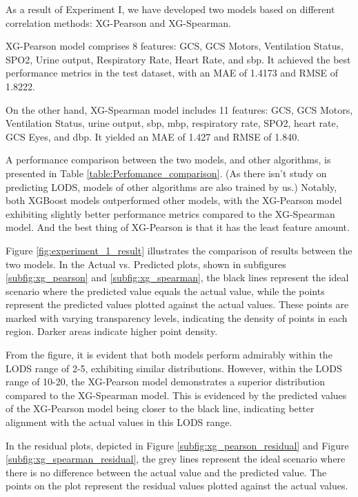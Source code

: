 \documentclass[12pt,a4paper,english
]{tunithesis}
\begin{document}
As a result of Experiment I, we have developed two models based on different correlation methods: XG-Pearson and XG-Spearman.

XG-Pearson model comprises 8 features: GCS, GCS Motors, Ventilation Status, SPO2, Urine output, Respiratory Rate, Heart Rate, and sbp. It achieved the best performance metrics in the test dataset, with an MAE of 1.4173 and RMSE of 1.8222.

On the other hand, XG-Spearman model includes 11 features: GCS, GCS Motors, Ventilation Status, urine output, sbp, mbp, respiratory rate, SPO2, heart rate, GCS Eyes, and dbp. It yielded an MAE of 1.427 and RMSE of 1.840.

A performance comparison between the two models, and other algorithms, is presented in Table \ref{table:Perfomance_comparison}. (As there isn't study on predicting LODS, models of other algorithms are also trained by us.) Notably, both XGBoost models outperformed other models, with the XG-Pearson model exhibiting slightly better performance metrics compared to the XG-Spearman model. And the best thing of XG-Pearson is that it has the least feature amount.

Figure \ref{fig:experiment_1_result} illustrates the comparison of results between the two models. In the Actual vs. Predicted plots, shown in subfigures \ref{subfig:xg_pearson} and \ref{subfig:xg_spearman}, the black lines represent the ideal scenario where the predicted value equals the actual value, while the points represent the predicted values plotted against the actual values. These points are marked with varying transparency levels, indicating the density of points in each region. Darker areas indicate higher point density.

From the figure, it is evident that both models perform admirably within the LODS range of 2-5, exhibiting similar distributions. However, within the LODS range of 10-20, the XG-Pearson model demonstrates a superior distribution compared to the XG-Spearman model. This is evidenced by the predicted values of the XG-Pearson model being closer to the black line, indicating better alignment with the actual values in this LODS range.

In the residual plots, depicted in Figure \ref{subfig:xg_pearson_residual} and Figure \ref{subfig:xg_spearman_residual}, the grey lines represent the ideal scenario where there is no difference between the actual value and the predicted value. The points on the plot represent the residual values plotted against the actual values.
\end{document}
